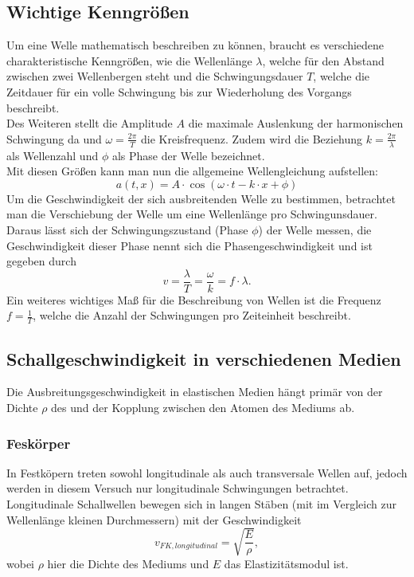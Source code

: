 \documentclass{article}
\begin{document}
\subsection{Wichtige Kenngrößen}
Um eine Welle mathematisch beschreiben zu können, braucht es verschiedene charakteristische Kenngrößen, wie die Wellenlänge $\lambda$, welche für den Abstand zwischen zwei Wellenbergen steht und die Schwingungsdauer $T$, welche die Zeitdauer für ein volle Schwingung bis zur Wiederholung des Vorgangs beschreibt. \\Des Weiteren stellt die Amplitude $A$ die maximale Auslenkung der harmonischen Schwingung da und $\omega = \frac{2 \pi}{T} $ die Kreisfrequenz. Zudem wird die Beziehung $k=\frac{2\pi}{\lambda}$ als Wellenzahl und $\phi$ als Phase der Welle bezeichnet.\\
Mit diesen Größen kann man nun die allgemeine Wellengleichung aufstellen:
\begin{equation}
a(t,x)= A \cdot \cos(\omega \cdot t - k \cdot x + \phi)
\end{equation}
Um die Geschwindigkeit der sich ausbreitenden Welle zu bestimmen, betrachtet man die Verschiebung der Welle um eine Wellenlänge pro Schwingunsdauer. Daraus lässt sich der Schwingungszustand (Phase $\phi$) der Welle messen, die Geschwindigkeit dieser Phase nennt sich die Phasengeschwindigkeit und ist gegeben durch 
\begin{equation}
v = \frac{\lambda}{T} = \frac{\omega}{k} = f \cdot \lambda .
\end{equation}
Ein weiteres wichtiges Maß für die Beschreibung von Wellen ist die Frequenz $f = \frac{1}{T}$, welche die Anzahl der Schwingungen pro Zeiteinheit beschreibt.
\subsection{Schallgeschwindigkeit in verschiedenen Medien}
Die Ausbreitungsgeschwindigkeit in elastischen Medien hängt primär von der Dichte $\rho$ des und der Kopplung zwischen den Atomen des Mediums ab.
\subsubsection{Feskörper}
In Festköpern treten sowohl longitudinale als auch transversale Wellen auf, jedoch werden in diesem Versuch nur longitudinale Schwingungen betrachtet.
Longitudinale Schallwellen bewegen sich in langen Stäben (mit im Vergleich zur Wellenlänge kleinen Durchmessern) mit der Geschwindigkeit
\begin{equation}
v_{FK, longitudinal} = \sqrt{\frac{E}{\rho}},
\end{equation}
wobei $\rho$ hier die Dichte des Mediums und $E$ das Elastizitätsmodul ist.
\end{document}
